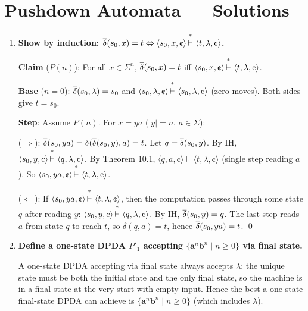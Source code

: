 
\chapter{Pushdown Automata --- Solutions}

\begin{enumerate}[{10.}1. ]

\item \textbf{Show by induction: $\DBAR(s_0,x)=t \Leftrightarrow \langle s_0,x,\cent\rangle\Dvdash\langle t,\lambda,\cent\rangle$.}

\textbf{Claim} ($P(n)$): For all $x \in \Sigma^n$, $\overline{\delta}(s_0,x)=t$ iff $\langle s_0,x,\cent\rangle\Dvdash\langle t,\lambda,\cent\rangle$.

\textbf{Base} ($n=0$): $\overline{\delta}(s_0,\lambda)=s_0$ and $\langle s_0,\lambda,\cent\rangle\Dvdash\langle s_0,\lambda,\cent\rangle$ (zero moves). Both sides give $t=s_0$. \checkmark

\textbf{Step}: Assume $P(n)$. For $x=ya$ ($|y|=n$, $a\in\Sigma$):

($\Rightarrow$): $\overline{\delta}(s_0,ya)=\delta(\overline{\delta}(s_0,y),a)=t$. Let $q=\overline{\delta}(s_0,y)$. By IH, $\langle s_0,y,\cent\rangle\Dvdash\langle q,\lambda,\cent\rangle$. By Theorem 10.1, $\langle q,a,\cent\rangle\vdash\langle t,\lambda,\cent\rangle$ (single step reading $a$). So $\langle s_0,ya,\cent\rangle\Dvdash\langle t,\lambda,\cent\rangle$.

($\Leftarrow$): If $\langle s_0,ya,\cent\rangle\Dvdash\langle t,\lambda,\cent\rangle$, then the computation passes through some state $q$ after reading $y$: $\langle s_0,y,\cent\rangle\Dvdash\langle q,\lambda,\cent\rangle$. By IH, $\overline{\delta}(s_0,y)=q$. The last step reads $a$ from state $q$ to reach $t$, so $\delta(q,a)=t$, hence $\overline{\delta}(s_0,ya)=t$. \qed

\item \textbf{Define a one-state DPDA $P'_1$ accepting $\{\pmb{a}^n\pmb{b}^n \mid n\geq 0\}$ via final state.}

A one-state DPDA accepting via final state always accepts $\lambda$: the unique state must be both the initial state and the only final state, so the machine is in a final state at the very start with empty input. Hence the best a one-state final-state DPDA can achieve is $\{\pmb{a}^n\pmb{b}^n \mid n\geq 0\}$ (which includes $\lambda$).


\end{enumerate}
